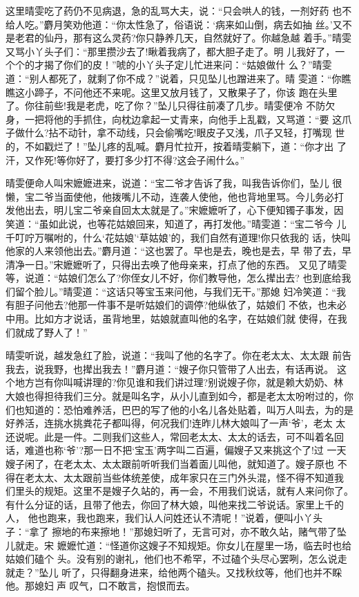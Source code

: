 这里晴雯吃了药仍不见病退，急的乱骂大夫，说：“只会哄人的钱，一剂好药
也不给人吃。”麝月笑劝他道：“你太性急了，俗语说：‘病来如山倒，病去如抽
丝。’又不是老君的仙丹，那有这么灵药?你只静养几天，自然就好了。你越急越
着手。”晴雯又骂小丫头子们：“那里攒沙去了!瞅着我病了，都大胆子走了。明
儿我好了，一个个的才揭了你们的皮！”唬的小丫头子定儿忙进来问：“姑娘做什
么？”晴雯道：“别人都死了，就剩了你不成？”说着，只见坠儿也蹭进来了。晴
雯道：“你瞧瞧这小蹄子，不问他还不来呢。这里又放月钱了，又散果子了，你该
跑在头里了。你往前些!我是老虎，吃了你？”坠儿只得往前凑了几步。晴雯便冷
不防欠身，一把将他的手抓住，向枕边拿起一丈青来，向他手上乱戳，又骂道：“要
这爪子做什么?拈不动针，拿不动线，只会偷嘴吃!眼皮子又浅，爪子又轻，打嘴现
世的，不如戳烂了！”坠儿疼的乱喊。麝月忙拉开，按着晴雯躺下，道：“你才出
了汗，又作死!等你好了，要打多少打不得?这会子闹什么。”

晴雯便命人叫宋嬷嬷进来，说道：“宝二爷才告诉了我，叫我告诉你们，坠儿
很懒，宝二爷当面使他，他拨嘴儿不动，连袭人使他，他也背地里骂。今儿务必打
发他出去，明儿宝二爷亲自回太太就是了。”宋嬷嬷听了，心下便知镯子事发，因
笑道：“虽如此说，也等花姑娘回来，知道了，再打发他。”晴雯道：“宝二爷今
儿千叮咛万嘱咐的，什么‘花姑娘’‘草姑娘’的，我们自然有道理!你只依我的
话，快叫他家的人来领他出去。”麝月道：“这也罢了。早也是去，晚也是去，早
带了去，早清净一日。”宋嬷嬷听了，只得出去唤了他母亲来，打点了他的东西。
又见了晴雯等，说道：“姑娘们怎么了?你侄女儿不好，你们教导他，怎么撵出去?
也到底给我们留个脸儿。”晴雯道：“这话只等宝玉来问他，与我们无干。”那媳
妇冷笑道：“我有胆子问他去?他那一件事不是听姑娘们的调停?他纵依了，姑娘们
不依，也未必中用。比如方才说话，虽背地里，姑娘就直叫他的名字，在姑娘们就
使得，在我们就成了野人了！”

晴雯听说，越发急红了脸，说道：“我叫了他的名字了。你在老太太、太太跟
前告我去，说我野，也撵出我去！”麝月道：“嫂子你只管带了人出去，有话再说。
这个地方岂有你叫喊讲理的?你见谁和我们讲过理?别说嫂子你，就是赖大奶奶、林
大娘也得担待我们三分。就是叫名字，从小儿直到如今，都是老太太吩咐过的，你
们也知道的：恐怕难养活，巴巴的写了他的小名儿各处贴着，叫万人叫去，为的是
好养活，连挑水挑粪花子都叫得，何况我们!连昨儿林大娘叫了一声‘爷’，老太
太还说呢。此是一件。二则我们这些人，常回老太太、太太的话去，可不叫着名回
话，难道也称‘爷’?那一日不把‘宝玉’两字叫二百遍，偏嫂子又来挑这个了!过
一天嫂子闲了，在老太太、太太跟前听听我们当着面儿叫他，就知道了。嫂子原也
不得在老太太、太太跟前当些体统差使，成年家只在三门外头混，怪不得不知道我
们里头的规矩。这里不是嫂子久站的，再一会，不用我们说话，就有人来问你了。
有什么分证的话，且带了他去，你回了林大娘，叫他来找二爷说话。家里上千的人，
他也跑来，我也跑来，我们认人问姓还认不清呢！”说着，便叫小丫头子：“拿了
擦地的布来擦地！”那媳妇听了，无言可对，亦不敢久站，赌气带了坠儿就走。宋
嬷嬷忙道：“怪道你这嫂子不知规矩。你女儿在屋里一场，临去时也给姑娘们磕个
头。没有别的谢礼，他们也不希罕，不过磕个头尽心罢咧，怎么说走就走？”坠儿
听了，只得翻身进来，给他两个磕头。又找秋纹等，他们也并不睬他。那媳妇声
叹气，口不敢言，抱恨而去。


